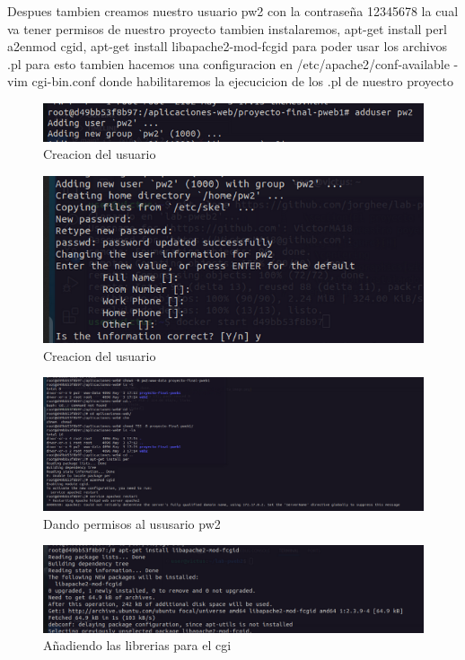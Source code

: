 Despues tambien creamos nuestro usuario pw2 con la contraseña 12345678 la cual va tener permisos de nuestro proyecto tambien instalaremos, apt-get install perl
a2enmod cgid, apt-get install libapache2-mod-fcgid para poder usar los archivos .pl para esto tambien hacemos una configuracion en /etc/apache2/conf-available - vim cgi-bin.conf
donde habilitaremos la ejecucicion de los .pl de nuestro proyecto
\begin{figure}[H]
  \centering
  \includegraphics[width=1.0\textwidth]{img/Usuario_pw2.png}
  \caption{Creacion del usuario}
\end{figure}
\begin{figure}[H]
  \centering
  \includegraphics[width=1.0\textwidth]{img/Usuario_pw2_2.png}
  \caption{Creacion del usuario}
\end{figure}
\begin{figure}[H]
  \centering
  \includegraphics[width=1.0\textwidth]{img/Dando_permisos.png}
  \caption{Dando permisos al ususario pw2}
\end{figure}
\begin{figure}[H]
  \centering
  \includegraphics[width=1.0\textwidth]{img/LIbrerias.png}
  \caption{Añadiendo las librerias para el cgi}
\end{figure}
